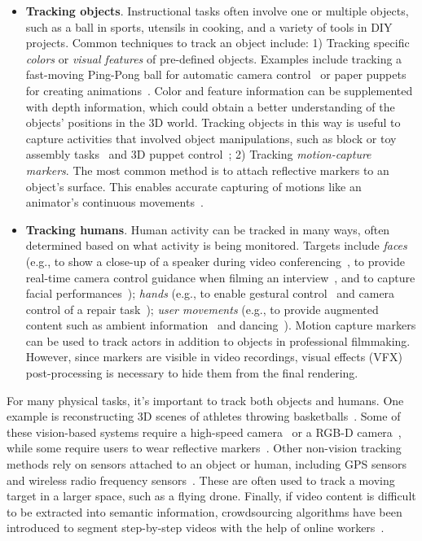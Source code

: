 \begin{itemize}
  \item \textbf{Tracking objects}. Instructional tasks often involve one or multiple objects, such as a ball in sports, utensils in cooking, and a variety of tools in DIY projects.
  Common techniques to track an object include:
  1) Tracking specific \emph{colors} or \emph{visual features} of pre-defined objects. Examples include tracking a fast-moving Ping-Pong ball for automatic camera control~\cite{Okumura:2011tr} or paper puppets for creating animations~\cite{Barnes:2008:VideoPuppetry}.
  Color and feature information can be supplemented with depth information, which could obtain a better understanding of the objects’ positions in the 3D world. Tracking objects in this way is useful to capture activities that involved object manipulations, such as block or toy assembly tasks~\cite{Gupta2012DuploTrack,Wu:2016:ARI:2856400.2856416} and 3D puppet control~\cite{held20123d};
  2) Tracking \emph{motion-capture markers}. The most common method is to attach reflective markers to an object's surface. This enables accurate capturing of motions like an animator's continuous movements~\cite{Dontcheva:2003:LAC:1201775.882285}.
  \item \textbf{Tracking humans}. Human activity can be tracked in many ways, often determined based on what activity is being monitored.
  Targets include \emph{faces} (e.g., to show a close-up of a speaker during video conferencing~\cite{Ranjan:2010}, to provide real-time camera control guidance when filming an interview~\cite{Carter:2010}, and to capture facial performances~\cite{Shi:2014:AAH:2661229.2661290,thies2016face}); \emph{hands} (e.g., to enable gestural control~\cite{taylor-siggraph2016} and camera control of a repair task~\cite{Ranjan:2008}); \emph{user movements} (e.g., to provide augmented content such as ambient information~\cite{Wilson:2012fb} and dancing~\cite{Anderson:2013:YEM:2501988.2502045}).
  Motion capture markers can be used to track actors in addition to objects in professional filmmaking. However, since markers are visible in video recordings, visual effects (VFX) post-processing is necessary to hide them from the final rendering.
\end{itemize}

For many physical tasks, it's important to track both objects and humans. One example is reconstructing 3D scenes of athletes throwing basketballs~\cite{dou-siggraph2016}.
%
Some of these vision-based systems require a high-speed camera~\cite{Okumura:2011tr} or a RGB-D camera~\cite{Gupta2012DuploTrack,Wu:2016:ARI:2856400.2856416,held20123d,Wilson:2012fb,Anderson:2013:YEM:2501988.2502045,dou-siggraph2016}, while some require users to wear reflective markers~\cite{Ranjan:2008}.
%
Other non-vision tracking methods rely on sensors attached to an object or human, including GPS sensors~\cite{HexoDrone} and wireless radio frequency sensors~\cite{Nguyen:2016:ICR:2935620.2935632}. These are often used to track a moving target in a larger space, such as a flying drone.
%
Finally, if video content is difficult to be extracted into semantic information, crowdsourcing algorithms have been introduced to segment step-by-step videos with the help of online workers~\cite{Kim:2014:CSI:2611222.2556986}.

